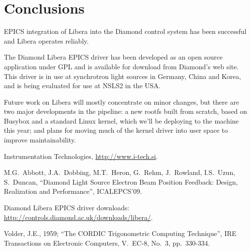 \documentclass{JAC2003}
\begin{document}
\section{Conclusions}

EPICS integration of Libera into the Diamond control system has been
successful and Libera operates reliably.

The Diamond Libera EPICS driver has been developed as an open source
application under GPL and is available for download from Diamond's web
site\cite{libera-epics-web}.  This driver is in use at synchrotron light
sources in Germany, China and Korea, and is being evaluated for use at NSLS2
in the USA.

Future work on Libera will mostly concentrate on minor changes, but there are
two major developments in the pipeline: a new rootfs built from scratch, based
on Busybox and a standard Linux kernel, which we'll be deploying to the
machine this year; and plans for moving much of the kernel driver into user
space to improve maintainability.




\begin{thebibliography}{9}

Instrumentation Technologies, \url{http://www.i-tech.si}.

M.G.~Abbott, J.A.~Dobbing, M.T.~Heron, G.~Rehm, J.~Rowland, I.S.~Uzun,
S.~Duncan, ``Diamond Light Source Electron Beam Position Feedback: Design,
Realization and Performance'', ICALEPCS'09. 


Diamond Libera EPICS driver downloads:
\url{http://controls.diamond.ac.uk/downloads/libera/}.

Volder, J.E., 1959; ``The CORDIC Trigonometric Computing Technique'', IRE
Transactions on Electronic Computers, V.~EC-8, No.~3, pp.~330-334.

\end{thebibliography}
\end{document}
